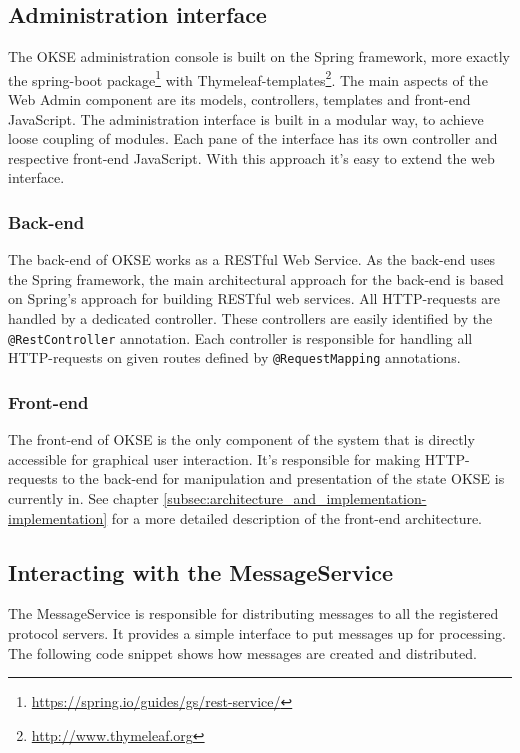 \subsection{Administration interface}
\label{subsec:administration_interface}

The OKSE administration console is built on the Spring framework, more exactly the spring-boot package\footnote{\url{https://spring.io/guides/gs/rest-service/}} with Thymeleaf-templates\footnote{\url{http://www.thymeleaf.org}}. The main aspects of the Web Admin component are its models, controllers, templates and front-end JavaScript. The administration interface is built in a modular way, to achieve loose coupling of modules. Each pane of the interface has its own controller and respective front-end JavaScript.  With this approach it's easy to extend the web interface.

\subsubsection{Back-end}

The back-end of OKSE works as a RESTful Web Service. As the back-end uses the Spring framework, the main architectural approach for the back-end is based on Spring’s approach for building RESTful web services. All HTTP-requests are handled by a dedicated controller. These controllers are easily identified by the \verb!@RestController! annotation. Each controller is responsible for handling all HTTP-requests on given routes defined by \verb!@RequestMapping! annotations. 

\subsubsection{Front-end}

The front-end of OKSE is the only component of the system that is directly accessible for graphical user interaction. It's responsible for making HTTP-requests to the back-end for manipulation and presentation of the state OKSE is currently in. See chapter \ref{subsec:architecture_and_implementation-implementation} for a more detailed description of the front-end architecture.

\subsection{Interacting with the MessageService}
\label{subsec:components-interacting_with_the_messageservice}

The MessageService is responsible for distributing messages to all the registered protocol servers. It provides a simple interface to put messages up for processing. The following code snippet shows how messages are created and distributed.

